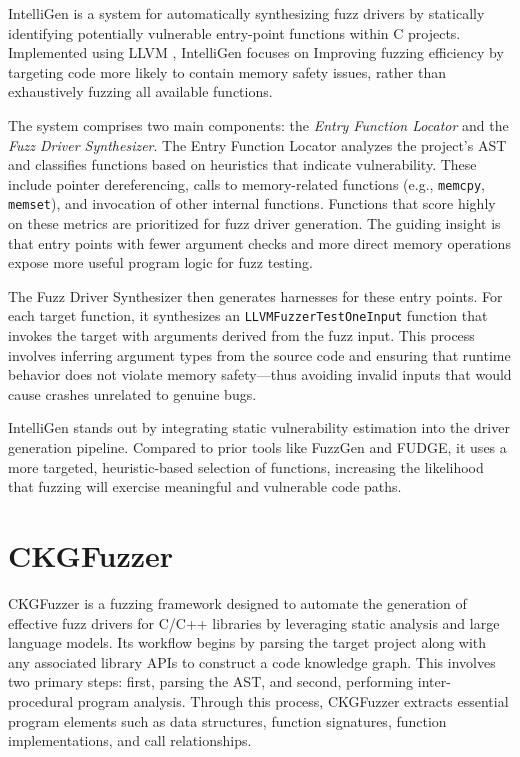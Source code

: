 \documentclass[
  a4paper,
]{scrreprt}
\theoremstyle{definition}
\theoremstyle{remark}
\begin{document}
IntelliGen \autocite{zhang2021} is a system for automatically
synthesizing fuzz drivers by statically identifying potentially
vulnerable entry-point functions within C projects. Implemented using
LLVM \autocite{llvm}, IntelliGen focuses on Improving fuzzing efficiency
by targeting code more likely to contain memory safety issues, rather
than exhaustively fuzzing all available functions.

The system comprises two main components: the \emph{Entry Function
Locator} and the \emph{Fuzz Driver Synthesizer}. The Entry Function
Locator analyzes the project's AST and classifies functions based on
heuristics that indicate vulnerability. These include pointer
dereferencing, calls to memory-related functions (e.g., \texttt{memcpy},
\texttt{memset}), and invocation of other internal functions. Functions
that score highly on these metrics are prioritized for fuzz driver
generation. The guiding insight is that entry points with fewer argument
checks and more direct memory operations expose more useful program
logic for fuzz testing.

The Fuzz Driver Synthesizer then generates harnesses for these entry
points. For each target function, it synthesizes an
\texttt{LLVMFuzzerTestOneInput} function that invokes the target with
arguments derived from the fuzz input. This process involves inferring
argument types from the source code and ensuring that runtime behavior
does not violate memory safety---thus avoiding invalid inputs that would
cause crashes unrelated to genuine bugs.

IntelliGen stands out by integrating static vulnerability estimation
into the driver generation pipeline. Compared to prior tools like
FuzzGen and FUDGE, it uses a more targeted, heuristic-based selection of
functions, increasing the likelihood that fuzzing will exercise
meaningful and vulnerable code paths.

\section{CKGFuzzer}\label{ckgfuzzer}

CKGFuzzer \autocite{xu2024} is a fuzzing framework designed to automate
the generation of effective fuzz drivers for C/C++ libraries by
leveraging static analysis and large language models. Its workflow
begins by parsing the target project along with any associated library
APIs to construct a code knowledge graph. This involves two primary
steps: first, parsing the AST, and second, performing inter-procedural
program analysis. Through this process, CKGFuzzer extracts essential
program elements such as data structures, function signatures, function
implementations, and call relationships.
\end{document}
